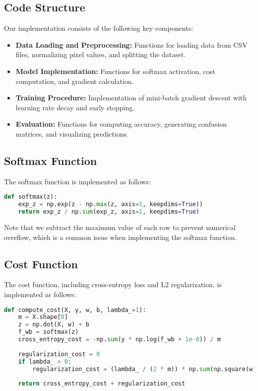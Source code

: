 \documentclass[10pt,journal,compsoc]{IEEEtran}
\begin{document}
\subsection{Code Structure}
Our implementation consists of the following key components:

\begin{itemize}
    \item \textbf{Data Loading and Preprocessing:} Functions for loading data from CSV files, normalizing pixel values, and splitting the dataset.
    
    \item \textbf{Model Implementation:} Functions for softmax activation, cost computation, and gradient calculation.
    
    \item \textbf{Training Procedure:} Implementation of mini-batch gradient descent with learning rate decay and early stopping.
    
    \item \textbf{Evaluation:} Functions for computing accuracy, generating confusion matrices, and visualizing predictions.
\end{itemize}

\subsection{Softmax Function}
The softmax function is implemented as follows:

\begin{lstlisting}[language=Python]
def softmax(z):
    exp_z = np.exp(z - np.max(z, axis=1, keepdims=True))
    return exp_z / np.sum(exp_z, axis=1, keepdims=True)
\end{lstlisting}

Note that we subtract the maximum value of each row to prevent numerical overflow, which is a common issue when implementing the softmax function.

\subsection{Cost Function}
The cost function, including cross-entropy loss and L2 regularization, is implemented as follows:

\begin{lstlisting}[language=Python]
def compute_cost(X, y, w, b, lambda_=1):
    m = X.shape[0]
    z = np.dot(X, w) + b
    f_wb = softmax(z)
    cross_entropy_cost = -np.sum(y * np.log(f_wb + 1e-8)) / m
    
    regularization_cost = 0
    if lambda_ > 0:
        regularization_cost = (lambda_ / (2 * m)) * np.sum(np.square(w))
    
    return cross_entropy_cost + regularization_cost
\end{lstlisting}
\end{document}
